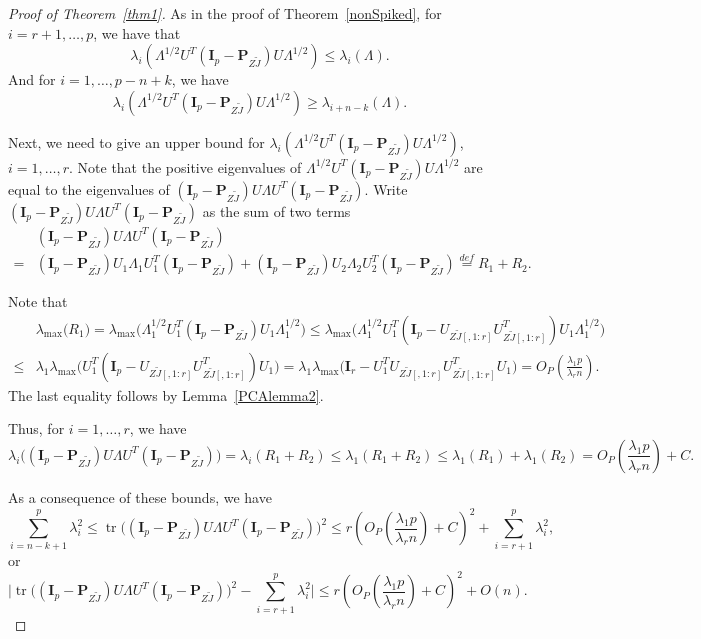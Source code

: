 \documentclass[12pt]{article} %
\DeclareMathOperator{\mytr}{tr}
\newcommand{\bP}{\mathbf{P}}
\newcommand{\bI}{\mathbf{I}}
\theoremstyle{definition}
\begin{document}
\begin{proof}[\textrm{Proof of Theorem~\ref{thm1}}]
    As in the proof of Theorem~\ref{nonSpiked}, for $i=r+1,\ldots, p$, we have  that
    \begin{equation}
    \lambda_i (\Lambda^{1/2}U^T (\bI_p-\bP_{Z\tilde{J}})U\Lambda^{1/2})\leq
    \lambda_i (\Lambda).
    \end{equation}
     And for $i=1,\ldots, p-n+k$, we have
    \begin{equation}
    \lambda_i (\Lambda^{1/2}U^T (\bI_p-\bP_{Z\tilde{J}})U\Lambda^{1/2})\geq
    \lambda_{i+n-k} (\Lambda).
    \end{equation}

    Next, we need to give an upper bound for $\lambda_i(\Lambda^{1/2}U^T (\bI_p-\bP_{Z\tilde{J}})U\Lambda^{1/2})$, $i=1,\ldots,r$.
    Note that the positive eigenvalues of $\Lambda^{1/2}U^T (\bI_p-\bP_{Z\tilde{J}})U\Lambda^{1/2}$ are equal to the eigenvalues of $(\bI_p-\bP_{Z\tilde{J}})U\Lambda U^T (\bI_p-\bP_{Z\tilde{J}})$.
Write $(\bI_p-\bP_{Z\tilde{J}})U\Lambda U^T (\bI_p-\bP_{Z\tilde{J}})$ as the sum of two terms
$$
\begin{aligned}
&(\bI_p-\bP_{Z\tilde{J}})U\Lambda U^T (\bI_p-\bP_{Z\tilde{J}})
\\
=&
(\bI_p-\bP_{Z\tilde{J}})U_1\Lambda_1 U_1^T(\bI_p-\bP_{Z\tilde{J}})+(\bI_p-\bP_{Z\tilde{J}})U_2\Lambda_2 U_2^T (\bI_p-\bP_{Z\tilde{J}})
\overset{def}{=}R_1+R_2.
\end{aligned}
$$

Note that
$$
\begin{aligned}
&\lambda_{\max}\big( R_1 \big)
=
\lambda_{\max}\big(\Lambda_1^{1/2} U_1^T(\bI_p-\bP_{Z\tilde{J}}) U_1 \Lambda_1^{1/2}\big)
\leq 
\lambda_{\max}\big(\Lambda_1^{1/2} U_1^T(\bI_p-U_{Z\tilde{J}[,1:r]}U_{Z\tilde{J}[,1:r]}^T) U_1 \Lambda_1^{1/2}\big)\\
\leq &
\lambda_1
\lambda_{\max}\big(U_1^T(\bI_p-U_{Z\tilde{J}[,1:r]}U_{Z\tilde{J}[,1:r]}^T) U_1 \big)
= 
\lambda_1
\lambda_{\max}\big(\bI_r - U_1^TU_{Z\tilde{J}[,1:r]}U_{Z\tilde{J}[,1:r]}^T U_1 \big)=O_P(\frac{\lambda_1 p}{\lambda_r n}).
\end{aligned}
$$
    The last equality follows by Lemma~\ref{PCAlemma2}.

Thus, for $i=1,\ldots, r$, we have
$$
    \lambda_i\big((\bI_p-\bP_{Z\tilde{J}})U\Lambda U^T (\bI_p-\bP_{Z\tilde{J}})\big)=
\lambda_i(R_1+R_2)\leq
\lambda_1(R_1+R_2)\leq \lambda_1(R_1)+\lambda_1(R_2)= O_P(\frac{\lambda_1 p}{\lambda_r n}) + C.
$$

As a consequence of these bounds, we have
$$
    \sum_{i=n-k+1}^p \lambda_i^2\leq \mytr\big((\bI_p-\bP_{Z\tilde{J}})U\Lambda U^T (\bI_p-\bP_{Z\tilde{J}})\big)^2 \leq  r(O_P(\frac{\lambda_1 p}{\lambda_r n})+C)^2+\sum_{i=r+1}^p \lambda_i^2,
$$
or
    \begin{equation}\label{eq:spiketrace1}
    \big|\mytr\big((\bI_p-\bP_{Z\tilde{J}})U\Lambda U^T (\bI_p-\bP_{Z\tilde{J}})\big)^2 - \sum_{i=r+1}^p \lambda_i^2 \big|\leq 
    r(O_P(\frac{\lambda_1 p}{\lambda_r n})+C)^2+O(n).
    \end{equation}


\end{proof}
\end{document}
